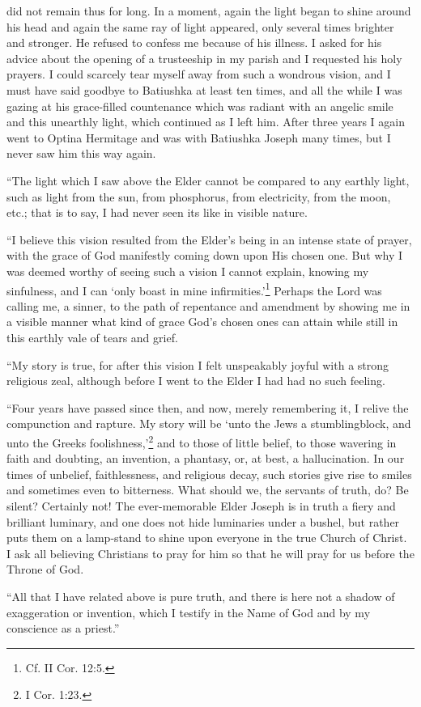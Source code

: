 did not remain thus for long. In a moment, again the light began to shine around his head and again the same ray of light appeared, only several times brighter and stronger. He refused to confess me because of his illness. I asked for his advice about the opening of a trusteeship in my parish and I requested his holy prayers. I could scarcely tear myself away from such a wondrous vision, and I must have said goodbye to Batiushka at least ten times, and all the while I was gazing at his grace-filled countenance which was radiant with an angelic smile and this unearthly light, which continued as I left him. After three years I again went to Optina Hermitage and was with Batiushka Joseph many times, but I never saw him this way again.

“The light which I saw above the Elder cannot be compared to any earthly light, such as light from the sun, from phosphorus, from electricity, from the moon, etc.; that is to say, I had never seen its like in visible nature.

“I believe this vision resulted from the Elder's being in an intense state of prayer, with the grace of God manifestly coming down upon His chosen one. But why I was deemed worthy of seeing such a vision I cannot explain, knowing my sinfulness, and I can ‘only boast in mine infirmities.'\footnote{Cf. II Cor. 12:5.} Perhaps the Lord was calling me, a sinner, to the path of repentance and amendment by showing me in a visible manner what kind of grace God's chosen ones can attain while still in this earthly vale of tears and grief.

“My story is true, for after this vision I felt unspeakably joyful with a strong religious zeal, although before I went to the Elder I had had no such feeling.

“Four years have passed since then, and now, merely remembering it, I relive the compunction and rapture. My story will be ‘unto the Jews a stumblingblock, and unto the Greeks foolishness,'\footnote{I Cor. 1:23.} and to those of little belief, to those wavering in faith and doubting, an invention, a phantasy, or, at best, a hallucination. In our times of unbelief, faithlessness, and religious decay, such stories give rise to smiles and sometimes even to bitterness. What should we, the servants of truth, do? Be silent? Certainly not! The ever-memorable Elder Joseph is in truth a fiery and brilliant luminary, and one does not hide luminaries under a bushel, but rather puts them on a lamp-stand to shine upon everyone in the true Church of Christ. I ask all believing Christians to pray for him so that he will pray for us before the Throne of God.

“All that I have related above is pure truth, and there is here not a shadow of exaggeration or invention, which I testify in the Name of God and by my conscience as a priest.”